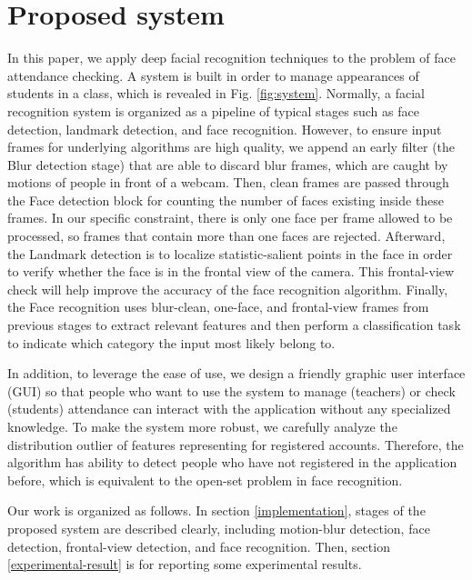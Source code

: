 \documentclass[journal, twocolumn]{IEEEtran}
\begin{document}
\medskip
\section{Proposed system}
\label{proposed-system}

In this paper, we apply deep facial recognition techniques to the problem of face attendance checking. A system is built in order to manage appearances of students in a class, which is revealed in Fig. \ref{fig:system}. Normally, a facial recognition system is organized as a pipeline of typical stages such as face detection, landmark detection, and face recognition. However, to ensure input frames for underlying algorithms are high quality, we append an early filter (the Blur detection stage) that are able to discard blur frames, which are caught by motions of people in front of a webcam. Then, clean frames are passed through the Face detection block for counting the number of faces existing inside these frames. In our specific constraint, there is only one face per frame allowed to be processed, so frames that contain more than one faces are rejected. Afterward, the Landmark detection is to localize statistic-salient points in the face in order to verify whether the face is in the frontal view of the camera. This frontal-view check will help improve the accuracy of the face recognition algorithm. Finally, the Face recognition uses blur-clean, one-face, and frontal-view frames from previous stages to extract relevant features and then perform a classification task to indicate which category the input most likely belong to.

In addition, to leverage the ease of use, we design a friendly graphic user interface (GUI) so that people who want to use the system to manage (teachers) or check (students) attendance can interact with the application without any specialized knowledge. To make the system more robust, we carefully analyze the distribution outlier of features representing for registered accounts. Therefore, the algorithm has ability to detect people who have not registered in the application before, which is equivalent to the open-set problem in face recognition.

Our work is organized as follows. In section \ref{implementation}, stages of the proposed system are described clearly, including motion-blur detection, face detection, frontal-view detection, and face recognition. Then, section \ref{experimental-result} is for reporting some experimental results.
\end{document}
